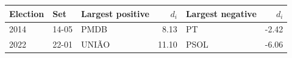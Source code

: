 \begin{tabular}{lllrlr}
\toprule
Election & Set & Largest positive & \(d_i\) & Largest negative & \(d_i\) \\
\midrule
2014 & 14-05 & PMDB & 8.13 & PT & -2.42 \\
2022 & 22-01 & UNIÃO & 11.10 & PSOL & -6.06 \\
\bottomrule
\end{tabular}
